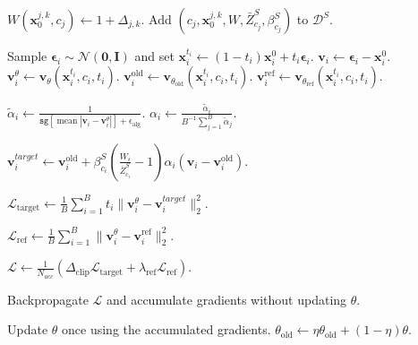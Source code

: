 \documentclass{article} %
\begin{document}
\begin{algorithm}
\begin{algorithmic}[1]
            \State $W(\mathbf{x}_{0}^{j,k},c_j) \leftarrow 1+\Delta_{j,k}$.
            \State Add $(c_j, \mathbf{x}_{0}^{j,k}, W, \bar Z_{c_j}^{S}, \beta_{c_j}^{S})$ to $\mathcal{D}^{S}$.
        \EndFor
    \EndFor

        \State Sample $\boldsymbol{\epsilon}_i\sim\mathcal{N}(\mathbf{0},\mathbf{I})$
        and set $\mathbf{x}_i^{t_i}\leftarrow (1-t_i)\mathbf{x}_i^0 + t_i\boldsymbol{\epsilon}_i$.
        \State $\mathbf{v}_i \leftarrow \boldsymbol{\epsilon}_i - \mathbf{x}_i^0$.
        \State $\mathbf{v}_i^{\theta}\leftarrow \mathbf{v}_{\theta}(\mathbf{x}_i^{t_i},c_i,t_i)$.
        \State $\mathbf{v}_i^{\mathrm{old}}\leftarrow \mathbf{v}_{\theta_{\mathrm{old}}}(\mathbf{x}_i^{t_i},c_i,t_i)$.
        \State $\mathbf{v}_i^{\mathrm{ref}}\leftarrow \mathbf{v}_{\theta_{\mathrm{ref}}}(\mathbf{x}_i^{t_i},c_i,t_i)$.

        \State $\widetilde{\alpha}_i\leftarrow \frac{1}{\mathtt{sg}[\operatorname{mean}|\mathbf v_i-\mathbf v_i^{\theta}|]+\epsilon_{\mathrm{alg}}}$.
        \State $\alpha_i\leftarrow \frac{\widetilde{\alpha}_i}{B^{-1}\sum_{j=1}^{B}\widetilde{\alpha}_j}$.

        \State $\mathbf{v}_{i}^{target}
        \leftarrow
        \mathbf{v}_i^{\mathrm{old}}
        +
        \beta_{c_i}^{S}
        \left(
        \frac{W_i}{\bar Z_{c_i}^{S}} - 1
        \right)
        \alpha_i
        (\mathbf{v}_i - \mathbf{v}_i^{\mathrm{old}})$. %

        \State $\mathcal{L}_{\mathrm{target}}
        \leftarrow
        \frac{1}{B}\sum_{i=1}^{B} t_i
        \|\mathbf{v}_i^{\theta} - \mathbf{v}_{i}^{target}\|_2^2$.

        \State $\mathcal{L}_{\mathrm{ref}}
        \leftarrow
        \frac{1}{B}\sum_{i=1}^{B}
        \|\mathbf{v}_i^{\theta} - \mathbf{v}_i^{\mathrm{ref}}\|_2^2$.

        \State $\mathcal{L}
        \leftarrow
        \frac{1}{N_{acc}}(\Delta_{\mathrm{clip}}\mathcal{L}_{\mathrm{target}}
        + \lambda_{\mathrm{ref}}\mathcal{L}_{\mathrm{ref}})$.

        \State Backpropagate $\mathcal{L}$ and accumulate gradients without updating $\theta$.
    \EndFor

    \State Update $\theta$ once using the accumulated gradients.
    \State $\theta_{\mathrm{old}}\leftarrow \eta\theta_{\mathrm{old}}+(1-\eta)\theta$.
\EndFor
\end{algorithmic}
\end{algorithm}
\end{document}
